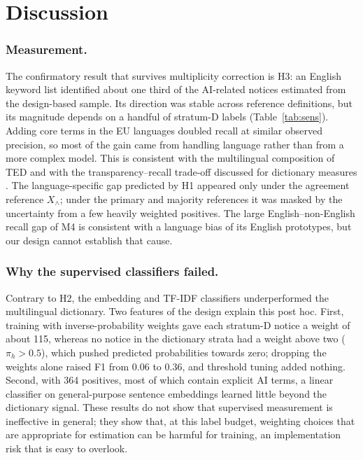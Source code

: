 \documentclass[runningheads]{llncs}
\begin{document}
\section{Discussion}
\subsubsection{Measurement.} The confirmatory result that survives multiplicity correction is H3: an English keyword list identified about one third of the AI-related notices estimated from the design-based sample. Its direction was stable across reference definitions, but its magnitude depends on a handful of stratum-D labels (Table~\ref{tab:sens}). Adding core terms in the EU languages doubled recall at similar observed precision, so most of the gain came from handling language rather than from a more complex model. This is consistent with the multilingual composition of TED \cite{ahmia2018} and with the transparency--recall trade-off discussed for dictionary measures \cite{gentzkow2019}. The language-specific gap predicted by H1 appeared only under the agreement reference $X_\wedge$; under the primary and majority references it was masked by the uncertainty from a few heavily weighted positives. The large English--non-English recall gap of M4 is consistent with a language bias of its English prototypes, but our design cannot establish that cause.

\subsubsection{Why the supervised classifiers failed.} Contrary to H2, the embedding and TF-IDF classifiers underperformed the multilingual dictionary. Two features of the design explain this post hoc. First, training with inverse-probability weights gave each stratum-D notice a weight of about 115, whereas no notice in the dictionary strata had a weight above two ($\pi_h>0.5$), which pushed predicted probabilities towards zero; dropping the weights alone raised F1 from 0.06 to 0.36, and threshold tuning added nothing. Second, with 364 positives, most of which contain explicit AI terms, a linear classifier on general-purpose sentence embeddings learned little beyond the dictionary signal. These results do not show that supervised measurement is ineffective in general; they show that, at this label budget, weighting choices that are appropriate for estimation can be harmful for training, an implementation risk that is easy to overlook.
\end{document}
